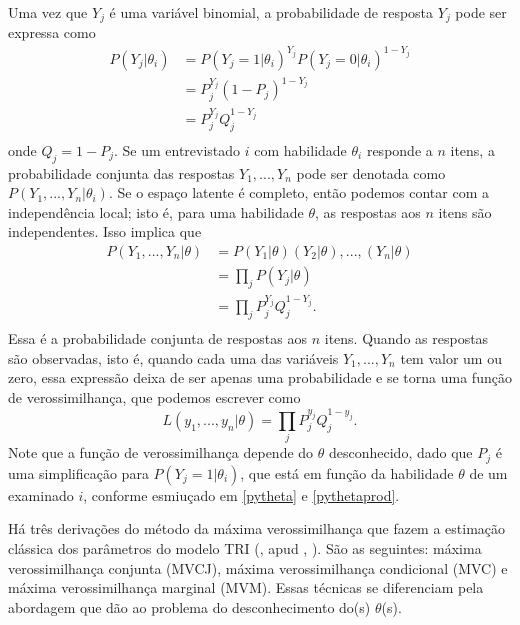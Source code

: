 \documentclass[
	12pt,				%
	openright,			%
	twoside,			%
	a4paper,			%
	english,			%
	brazil				%
	]{abntex2}
\begin{document}
 Uma vez que $Y_{j}$ é uma variável binomial, a probabilidade de resposta $Y_{j}$ pode ser expressa como
 \begin{equation}\label{pytheta}
    \begin{aligned}
        P(Y_{j} | \theta_{i}) &= P(Y_{j} = 1 | \theta_{i})^{Y_{j}} P(Y_{j} = 0 | \theta_{i})^{1 - Y_{j}} \\
        & = P_{j}^{Y_{j}} (1 - P_{j})^{1 - Y_{j}} \\
        & = P_{j}^{Y_{j}} Q_{j}^{1 - Y_{j}} \\
     \end{aligned}
 \end{equation}
 onde $Q_{j} = 1 - P_{j}$. Se um entrevistado $i$ com habilidade $\theta_{i}$ responde a $n$ itens, a probabilidade conjunta das respostas $Y_{1}, ..., Y_{n}$ pode ser denotada como $P(Y_{1}, ..., Y_{n} | \theta_{i})$. Se o espaço latente é completo, então podemos contar com a independência local; isto é, para uma habilidade $\theta$, as respostas aos $n$ itens são independentes. Isso implica que
 \begin{equation}\label{pythetaprod}
    \begin{aligned}
        P(Y_{1}, ..., Y_{n} | \theta) &= P(Y_{1} | \theta)(Y_{2} | \theta), ..., (Y_{n} | \theta) \\
        & = \prod_{j} P(Y_{j} | \theta) \\
        & = \prod_{j} P_{j}^{Y_{j}} Q_{j}^{1 - Y_{j}}. \\
     \end{aligned}
 \end{equation}
 Essa é a probabilidade conjunta de respostas aos $n$ itens. Quando as respostas são observadas, isto é, quando cada uma das variáveis $Y_{1}, ..., Y_{n}$ tem valor um ou zero, essa expressão deixa de ser apenas uma probabilidade e se torna uma função de verossimilhança, que podemos escrever como
 \begin{equation}
        L(y_{1}, ..., y_{n} | \theta) = \prod_{j} P_{j}^{y_{j}} Q_{j}^{1 - y_{j}}.
 \end{equation}
 Note que a função de verossimilhança depende do $\theta$ desconhecido, dado que $P_{j}$ é uma simplificação para $P(Y_{j} = 1| \theta_{i})$, que está em função da habilidade $\theta$ de um examinado $i$, conforme esmiuçado em \ref{pytheta} e \ref{pythetaprod}.
 
 Há três derivações do método da máxima verossimilhança que fazem a estimação clássica dos parâmetros do modelo TRI (, \citeyear{bazan2005} apud , \citeyear{campos2016}). São as seguintes: máxima verossimilhança conjunta (MVCJ), máxima verossimilhança condicional (MVC) e máxima verossimilhança marginal (MVM). Essas técnicas se diferenciam pela abordagem que dão ao problema do desconhecimento do(s) $\theta$(s).
 
\end{document}
